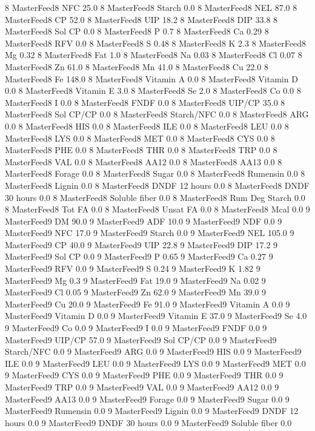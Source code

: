 \documentclass[letterpaper,10pt,english]{sphinxmanual}
\begin{document}
\begin{sphinxVerbatim}[commandchars=\\\{\},numbers=left,firstnumber=1,stepnumber=1]
8 MasterFeed8 NFC 25.0
8 MasterFeed8 Starch 0.0
8 MasterFeed8 NEL 87.0
8 MasterFeed8 CP 52.0
8 MasterFeed8 UIP 18.2
8 MasterFeed8 DIP 33.8
8 MasterFeed8 Sol CP 0.0
8 MasterFeed8 P 0.7
8 MasterFeed8 Ca 0.29
8 MasterFeed8 RFV 0.0
8 MasterFeed8 S 0.48
8 MasterFeed8 K 2.3
8 MasterFeed8 Mg 0.32
8 MasterFeed8 Fat 1.0
8 MasterFeed8 Na 0.03
8 MasterFeed8 Cl 0.07
8 MasterFeed8 Zn 61.0
8 MasterFeed8 Mn 41.0
8 MasterFeed8 Cu 22.0
8 MasterFeed8 Fe 148.0
8 MasterFeed8 Vitamin A 0.0
8 MasterFeed8 Vitamin D 0.0
8 MasterFeed8 Vitamin E 3.0
8 MasterFeed8 Se 2.0
8 MasterFeed8 Co 0.0
8 MasterFeed8 I 0.0
8 MasterFeed8 FNDF 0.0
8 MasterFeed8 UIP/CP 35.0
8 MasterFeed8 Sol CP/CP 0.0
8 MasterFeed8 Starch/NFC 0.0
8 MasterFeed8 ARG 0.0
8 MasterFeed8 HIS 0.0
8 MasterFeed8 ILE 0.0
8 MasterFeed8 LEU 0.0
8 MasterFeed8 LYS 0.0
8 MasterFeed8 MET 0.0
8 MasterFeed8 CYS 0.0
8 MasterFeed8 PHE 0.0
8 MasterFeed8 THR 0.0
8 MasterFeed8 TRP 0.0
8 MasterFeed8 VAL 0.0
8 MasterFeed8 AA\PYGZsh{}12 0.0
8 MasterFeed8 AA\PYGZsh{}13 0.0
8 MasterFeed8 \PYGZpc{} Forage 0.0
8 MasterFeed8 Sugar \PYGZpc{} 0.0
8 MasterFeed8 Rumensin 0.0
8 MasterFeed8 Lignin 0.0
8 MasterFeed8 DNDF 12 hours 0.0
8 MasterFeed8 DNDF 30 hours 0.0
8 MasterFeed8 Soluble fiber 0.0
8 MasterFeed8 Rum Deg Starch 0.0
8 MasterFeed8 Tot FA 0.0
8 MasterFeed8 Unsat FA 0.0
8 MasterFeed8 Mcal 0.0
9 MasterFeed9 DM 90.0
9 MasterFeed9 ADF 10.0
9 MasterFeed9 NDF 0.0
9 MasterFeed9 NFC 17.0
9 MasterFeed9 Starch 0.0
9 MasterFeed9 NEL 105.0
9 MasterFeed9 CP 40.0
9 MasterFeed9 UIP 22.8
9 MasterFeed9 DIP 17.2
9 MasterFeed9 Sol CP 0.0
9 MasterFeed9 P 0.65
9 MasterFeed9 Ca 0.27
9 MasterFeed9 RFV 0.0
9 MasterFeed9 S 0.24
9 MasterFeed9 K 1.82
9 MasterFeed9 Mg 0.3
9 MasterFeed9 Fat 19.0
9 MasterFeed9 Na 0.02
9 MasterFeed9 Cl 0.05
9 MasterFeed9 Zn 62.0
9 MasterFeed9 Mn 39.0
9 MasterFeed9 Cu 20.0
9 MasterFeed9 Fe 91.0
9 MasterFeed9 Vitamin A 0.0
9 MasterFeed9 Vitamin D 0.0
9 MasterFeed9 Vitamin E 37.0
9 MasterFeed9 Se 4.0
9 MasterFeed9 Co 0.0
9 MasterFeed9 I 0.0
9 MasterFeed9 FNDF 0.0
9 MasterFeed9 UIP/CP 57.0
9 MasterFeed9 Sol CP/CP 0.0
9 MasterFeed9 Starch/NFC 0.0
9 MasterFeed9 ARG 0.0
9 MasterFeed9 HIS 0.0
9 MasterFeed9 ILE 0.0
9 MasterFeed9 LEU 0.0
9 MasterFeed9 LYS 0.0
9 MasterFeed9 MET 0.0
9 MasterFeed9 CYS 0.0
9 MasterFeed9 PHE 0.0
9 MasterFeed9 THR 0.0
9 MasterFeed9 TRP 0.0
9 MasterFeed9 VAL 0.0
9 MasterFeed9 AA\PYGZsh{}12 0.0
9 MasterFeed9 AA\PYGZsh{}13 0.0
9 MasterFeed9 \PYGZpc{} Forage 0.0
9 MasterFeed9 Sugar \PYGZpc{} 0.0
9 MasterFeed9 Rumensin 0.0
9 MasterFeed9 Lignin 0.0
9 MasterFeed9 DNDF 12 hours 0.0
9 MasterFeed9 DNDF 30 hours 0.0
9 MasterFeed9 Soluble fiber 0.0

\end{sphinxVerbatim}
\end{document}
